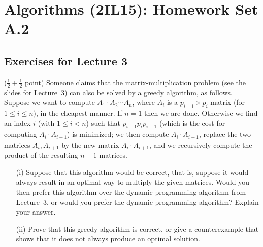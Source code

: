 \documentclass{article}
\title{}
\author{}
\date{}
\renewcommand{\leq}{\leqslant}
\newcounter{rcounter}
\newenvironment{rlist}%
{\begin{list}{A.2-\arabic{rcounter}}{\usecounter{rcounter}}}{\end{list}}
\begin{document}
\section*{Algorithms (2IL15): Homework Set A.2}

\subsection*{Exercises for Lecture 3}
\begin{rlist}
\item ($\frac{1}{2}+\frac{1}{2}$ point) Someone claims that the matrix-multiplication problem
      (see the slides for Lecture~3) can also
      be solved by a greedy algorithm, as follows. Suppose we want to compute
      $A_1\cdot A_2 \cdots A_n$, where  $A_i$ is a $p_{i-1}\times p_i$ matrix (for $1\leq i\leq n$),
      in the cheapest manner.
      If $n=1$ then we are done. Otherwise we find an index $i$ (with $1\leq i<n$)
      such that $p_{i-1} p_i p_{i+1}$ (which is the cost for computing $A_i \cdot A_{i+1}$)
      is minimized; we then compute $A_i \cdot A_{i+1}$, replace the two matrices $A_i, A_{i+1}$
      by the new matrix $A_i \cdot A_{i+1}$, and we recursively compute the product of the resulting
      $n-1$ matrices.
      \begin{enumerate}
      \item[(i)] Suppose that this algorithm would be correct, that is,
                 suppose it would always result in an optimal way to
                 multiply the given matrices. Would you then prefer this
                 algorithm over the dynamic-programming algorithm from
                 Lecture~3, or would you prefer the dynamic-programming algorithm?
                 Explain your answer.
      \item[(ii)] Prove that this greedy algorithm is correct, or give a counterexample that
                  shows that it does not always produce an optimal solution.
      \end{enumerate}


\end{rlist}
\end{document}
